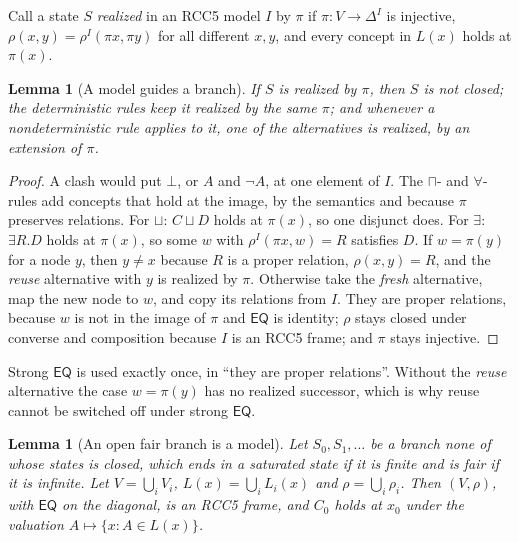 \documentclass[11pt]{article}
\newcommand{\EQ}{\mathsf{EQ}}
\theoremstyle{plain}
\newtheorem{lemma}[theorem]{Lemma}
\theoremstyle{definition}
\begin{document}
Call a state $S$ \emph{realized} in an RCC5 model $I$ by $\pi$ if
$\pi\colon V\to\Delta^I$ is injective, $\rho(x,y)=\rho^I(\pi x,\pi y)$ for all
different $x,y$, and every concept in $L(x)$ holds at $\pi(x)$.

\begin{lemma}[A model guides a branch]\label{lem:guides}
If $S$ is realized by $\pi$, then $S$ is not closed; the deterministic rules
keep it realized by the same $\pi$; and whenever a nondeterministic rule
applies to it, one of the alternatives is realized, by an extension of $\pi$.
\end{lemma}

\begin{proof}
A clash would put $\bot$, or $A$ and $\neg A$, at one element of $I$. The
$\sqcap$- and $\forall$-rules add concepts that hold at the image, by the
semantics and because $\pi$ preserves relations. For $\sqcup$: $C\sqcup D$
holds at $\pi(x)$, so one disjunct does. For $\exists$: $\exists R.D$ holds at
$\pi(x)$, so some $w$ with $\rho^I(\pi x,w)=R$ satisfies $D$. If $w=\pi(y)$ for
a node $y$, then $y\neq x$ because $R$ is a proper relation, $\rho(x,y)=R$,
and the \emph{reuse} alternative with $y$ is realized by $\pi$. Otherwise take
the \emph{fresh} alternative, map the new node to $w$, and copy its relations
from $I$. They are proper relations, because $w$ is not in the image of $\pi$
and $\EQ$ is identity; $\rho$ stays closed under converse and composition
because $I$ is an RCC5 frame; and $\pi$ stays injective.
\end{proof}

Strong $\EQ$ is used exactly once, in ``they are proper relations''. Without
the \emph{reuse} alternative the case $w=\pi(y)$ has no realized successor,
which is why reuse cannot be switched off under strong $\EQ$.

\begin{lemma}[An open fair branch is a model]\label{lem:openbranch}
Let $S_0,S_1,\dots$ be a branch none of whose states is closed, which ends in
a saturated state if it is finite and is fair if it is infinite. Let
$V=\bigcup_i V_i$, $L(x)=\bigcup_i L_i(x)$ and $\rho=\bigcup_i\rho_i$. Then
$(V,\rho)$, with $\EQ$ on the diagonal, is an RCC5 frame, and $C_0$ holds at
$x_0$ under the valuation $A\mapsto\{x: A\in L(x)\}$.
\end{lemma}
\end{document}

